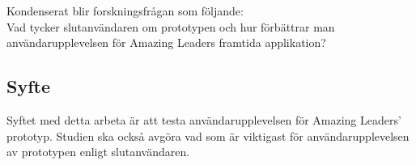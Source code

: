 Kondenserat blir forskningsfrågan som följande: \\

Vad tycker slutanvändaren om prototypen och hur förbättrar man användarupplevelsen för Amazing Leaders framtida applikation? 








\subsection{Syfte}
Syftet med detta arbeta är att testa  användarupplevelsen för Amazing Leaders' prototyp. Studien ska också avgöra vad som är viktigast för användarupplevelsen av prototypen enligt slutanvändaren.

